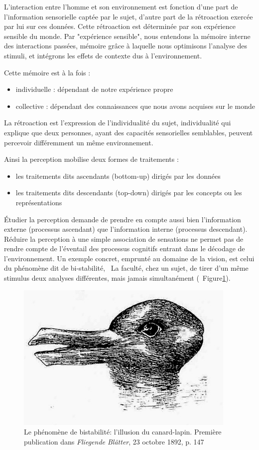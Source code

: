 L'interaction entre l'homme et son environnement est fonction d'une part de l'information sensorielle captée par le sujet, d'autre part de la rétroaction exercée par lui sur ces données. Cette rétroaction est déterminée par son expérience sensible du monde. Par "expérience sensible", nous entendons la mémoire interne des interactions passées, mémoire grâce à laquelle nous optimisons l'analyse des stimuli, et intégrons les effets de contexte dus à l'environnement.

Cette mémoire est à la fois :

\begin{itemize}
\item individuelle : dépendant de notre expérience propre
\item collective : dépendant des connaissances que nous avons acquises sur le monde
\end{itemize}

La rétroaction est l'expression de l'individualité du sujet, individualité qui explique que deux personnes, ayant des capacités sensorielles semblables, peuvent percevoir différemment un même environnement.

Ainsi la perception mobilise deux formes de traitements :

\begin{itemize}
\item les traitements dits ascendants (bottom-up) dirigés par les données
\item les traitements dits descendants (top-down) dirigés par les concepts ou les représentations
\end{itemize}

Étudier la perception demande de prendre en compte aussi bien l'information externe (processus ascendant) que l'information interne (processus descendant). Réduire la perception à une simple association de sensations ne permet pas de rendre compte de l'éventail des processus cognitifs entrant dans le décodage de l'environnement. Un exemple concret, emprunté au domaine de la vision, est celui du phénomène dit de bi-stabilité, \ie~La faculté, chez un sujet, de tirer d'un même stimulus deux analyses différentes, mais jamais simultanément (\Cf~Figure\ref{fig:bistabilite}). \\

\begin{figure}[bth]
        \myfloatalign
        \includegraphics[width=.6\linewidth]{gfx/canard_lapin}
        \caption[Le phénomène de bistabilité: l'illusion du canard-lapin]{Le phénomène de bistabilité: l'illusion du canard-lapin. Première publication dans \emph{Fliegende Blätter}, 23 octobre 1892, p. 147}\label{fig:bistabilite}
\end{figure}

